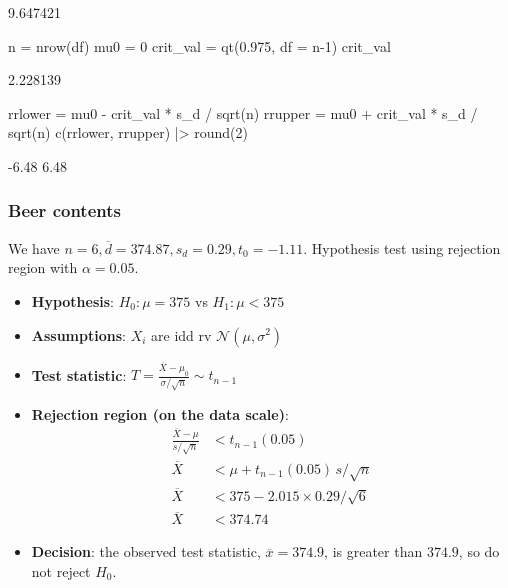 \documentclass[a4paper]{article}\usepackage[]{graphicx}\usepackage[]{xcolor}
\begin{document}
\begin{Schunk}
\begin{Soutput}
[1] 9.647421
\end{Soutput}
\begin{Sinput}
n = nrow(df)
mu0 = 0
crit_val = qt(0.975, df = n-1)
crit_val
\end{Sinput}
\begin{Soutput}
[1] 2.228139
\end{Soutput}
\begin{Sinput}
rrlower = mu0 - crit_val * s_d / sqrt(n)
rrupper = mu0 + crit_val * s_d / sqrt(n)
c(rrlower, rrupper) |> round(2)
\end{Sinput}
\begin{Soutput}
[1] -6.48  6.48
\end{Soutput}
\end{Schunk}
\subsubsection{Beer contents}
We have \( n = 6, \overline{d}=374.87, s_d = 0.29, t_0 = -1.11 \). Hypothesis test using rejection region with \( \alpha = 0.05 \).
\begin{itemize}
	\item \textbf{Hypothesis}: \( H_0: \mu = 375 \) vs \( H_1: \mu < 375 \)
	\item \textbf{Assumptions}: \( X_i \) are idd rv \( \mathcal{N}(\mu,\sigma^2) \)
	\item \textbf{Test statistic}: \( T = \frac{\overline{X}-\mu_0}{\sigma/\sqrt{n}} \sim t_{n-1} \)
	\item \textbf{Rejection region (on the data scale)}:
		\begin{align*}
		\frac{\overline{X} - \mu}{ s/\sqrt{n} } & < t_{n-1}(0.05)  \\
		\overline{X} & < \mu + t_{n-1}(0.05) \, s/\sqrt{n} \\
		\overline{X} & < 375 - 2.015 \times 0.29/\sqrt{6} \\
		\overline{X} & < 374.74
		\end{align*}
	\item \textbf{Decision}: the observed test statistic, \( \overline{x} = 374.9 \), is greater than \( 374.9 \), so do not reject \( H_0 \).
\end{itemize}
\end{document}
